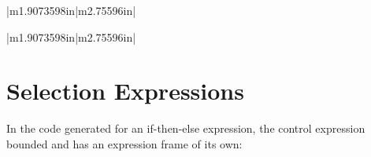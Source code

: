 \begin{center}
\tablelasttail{\hline}
\begin{xtabular}{|m{1.9073598in}|m{2.75596in}|}

\end{xtabular}
\end{center}

\bigskip

\begin{center}
\tablelasttail{\hline}
\begin{xtabular}{|m{1.9073598in}|m{2.75596in}|}

\end{xtabular}
\end{center}


\section{Selection Expressions}

In the code generated for an if-then-else expression, the control
expression bounded and has an expression frame of its own:

